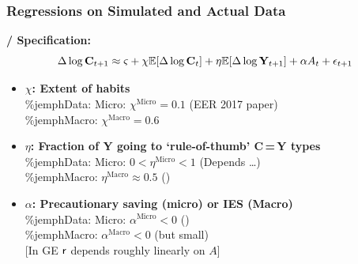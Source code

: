 \documentclass{beamer}\usepackage{dcolumn}
\newcommand{\jbemph}[1]{\textbf{\color{SlideNavy}#1}}
\begin{document}
\begin{frame}
\frametitle{Regressions on Simulated and Actual Data}
\jbemph{\cite{dynanHabits}/\cite{som07} Specification:}
$$
 \Delta \log \mathbf{C}_{t+1} \approx  \varsigma +\chi \mathbb{E}[ \Delta \log \mathbf{C}_{t}] + \eta \mathbb{E}[\Delta \log \mathbf{Y}_{t+1}]+\alpha A_{t}   +\epsilon_{t+1}
$$
\vspace*{-0.5cm}
\begin{itemize}
\setlength{\itemsep}{2mm}
\item \jbemph{$\chi$: Extent of habits}\\
\%jemph{Data: Micro:} $\chi^{\text{Micro}} = 0.1$ (EER 2017 paper)\\
\hspace*{1.1cm}\%jemph{Macro:} $\chi^{\text{Macro}} = 0.6$

\item  \jbemph{$\eta$: Fraction of Y going to `rule-of-thumb' C\,=\,Y types}\\
\%jemph{Data: Micro:} $0<\eta^{\text{Micro}} <1$ (Depends \dots)\\
\hspace*{1.1cm}\%jemph{Macro:} $\eta^{\text{Macro}} \approx 0.5$ (\cite{cmModel})

\item  \jbemph{$\alpha$: Precautionary saving (micro) or IES (Macro)}\\
\%jemph{Data: Micro:} $\alpha^{\text{Micro}}<0$ (\cite{zeldes:jpe})\\
\hspace*{1.1cm}\%jemph{Macro:} $\alpha^{\text{Macro}}<0$ (but small)\\
{[In GE $\mathsf{r}$ depends roughly linearly on $A$]}
\end{itemize}

\end{frame}
\end{document}
